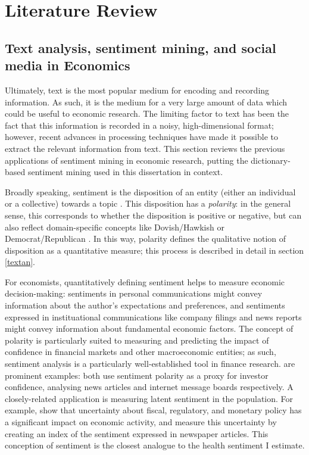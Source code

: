 \documentclass{article}
\begin{document}
\section{Literature Review}
\subsection{Text analysis, sentiment mining, and social media in Economics}\label{sentmining}
Ultimately, text is the most popular medium for encoding and recording information. As such, it is the medium for a very large amount of data which could be useful to economic research. The limiting factor to text has been the fact that this information is recorded in a noisy, high-dimensional format; however, recent advances in processing techniques have made it possible to extract the relevant information from text. This section reviews the previous applications of sentiment mining in economic research, putting the dictionary-based sentiment mining used in this dissertation in context.

Broadly speaking, sentiment is the disposition of an entity (either an individual or a collective) towards a topic \parencite{algabaEconometricsMeetsSentiment2020}. This disposition has a \textit{polarity}: in the general sense, this corresponds to whether the disposition is positive or negative, but can also reflect domain-specific concepts like Dovish/Hawkish \parencite{picaultWordsAreNot2017} or Democrat/Republican \parencite{gentzkowWhatDrivesMedia2010}. In this way, polarity defines the qualitative notion of disposition as a quantitative measure; this process is described in detail in section \ref{textan}. 

For economists, quantitatively defining sentiment helps to measure economic decision-making: sentiments in personal communications might convey information about the author's expectations and preferences, and sentiments expressed in instituational communications like company filings and news reports might convey information about fundamental economic factors. The concept of polarity is particularly suited to measuring and predicting the impact of confidence in financial markets and other macroeconomic entities; as such, sentiment analysis is a particularly well-established tool in finance research. \textcite{tetlockGivingContentInvestor2007a,antweilerAllThatTalk2004} are prominent examples: both use sentiment polarity as a proxy for investor confidence, analysing news articles and internet message boards respectively. A closely-related application is measuring latent sentiment in the population. For example, \textcite{bakerMeasuringEconomicPolicy2016} show that uncertainty about fiscal, regulatory, and monetary policy has a significant impact on economic activity, and measure this uncertainty by creating an index of the sentiment expressed in newspaper articles. This conception of sentiment is the closest analogue to the health sentiment I estimate.
\end{document}
